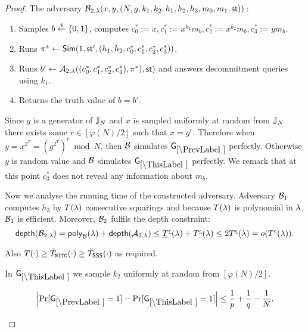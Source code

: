 \begin{proof}
The adversary $\mathcal{B}_{2,\lambda}(x,y,(N,g,k_1, k_2, h_1,h_2,h_3, m_0, m_1, \mathsf{st})):$
\vspace{-2mm}
\begin{enumerate}
\item Samples $b \stackrel{{\scriptscriptstyle\$}}{\leftarrow} \{0,1\}$, computes $c_0^*:=x, c_1^*:=x^{k_1} m_b, c_2^*:=x^{k_2}m_b, c_3^*:=y m_b$.
\item Runs $\pi^* \leftarrow \mathsf{Sim}(1, \mathsf{st}', (h_1, h_2, c_0^*, c_1^*, c_2^*, c_3^*))$.
\item Runs $b' \leftarrow \mathcal{A}_{2, \lambda}((c_0^*, c_1^*, c_2^*, c_3^*), \pi^*), \mathsf{st})$ and answers decommitment queries using $k_1$.
\item Returns the truth value of $b=b'$.
\end{enumerate}
Since $g$ is a generator of $\mathbb{J}_N$ and $x$ is sampled uniformly at random from $\mathbb{J}_N$ there exists some $r \in [\varphi(N)/2]$ such that $x = g^{r}$. Therefore when $y = x^{2^T} = (g^{2^T})^{r} \bmod N$, then $\mathcal{B}$ simulates $\games_\prevgame$ perfectly. Otherwise $y$ is random value and $\mathcal{B}$ simulates $\games_\thisgame$ perfectly. We remark that at this point $c_3^*$ does not reveal any information about $m_b$.

Now we analyse the running time of the constructed adversary. Adversary $\mathcal{B}_1$ computes $h_3$ by $T(\lambda)$ consecutive squarings and because $T(\lambda)$ is polynomial in $\lambda$, $\mathcal{B}_1$ is efficient. Moreover, $\mathcal{B}_2$ fulfils the depth constraint:
\[ \mathsf{depth}(\mathcal{B}_{2,\lambda}) = \mathsf{poly}_{\mathcal{B}}(\lambda) + \mathsf{depth}(\mathcal{A}_{2,\lambda}) \leq \underline{T}^{\underline{\epsilon}}(\lambda) + T^{\underline{\epsilon}}(\lambda) \leq 2 T^{\underline{\epsilon}}(\lambda) = o(T^{\epsilon}(\lambda)). \] 

Also $T(\cdot) \geq \tilde{T}_{\mathtt{NITC}}(\cdot) \geq \tilde{T}_\mathsf{SSS}(\cdot)$ as required.  

%


In $\games_\thisgame$ we sample $k_2$ uniformly at random from $[\varphi(N)/2]$. 

\begin{lemma}
\[
\left|\Pr[\games_\prevgame = 1] - \Pr[\games_\thisgame = 1]\right| \leq \frac{1}{p}+\frac{1}{q}-\frac{1}{N}.
\]
\end{lemma}


\end{proof}
